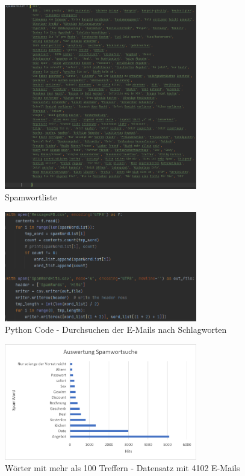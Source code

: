 \begin{figure}
    \centering
    \includegraphics[width=0.75\textwidth]{images/Spamwortliste.PNG}
    \caption{Spamwortliste} 
    \label{fig:spamwortliste}
\end{figure}

\begin{figure}
    \centering
    \includegraphics[width=0.75\textwidth]{images/python_Spamwordsearch.PNG}
    \caption{Python Code - Durchsuchen der E-Mails nach Schlagworten} 
    \label{fig:spamwordsearch}
\end{figure}

\begin{figure}
    \centering
    \includegraphics[width=0.75\textwidth]{images/Auswertung_Spamwortsuche.png}
    \caption{Wörter mit mehr als 100 Treffern - Datensatz mit 4102 E-Mails} 
    \label{fig:spamwortlistegreater100}
\end{figure}


